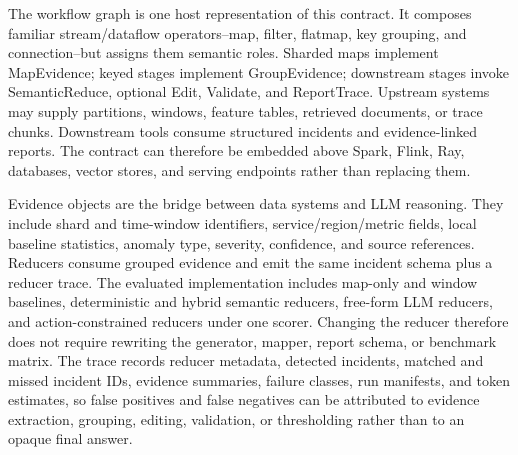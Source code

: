 \documentclass[sigplan,anonymous,nonacm]{acmart}
\begin{document}
The workflow graph is one host representation of this contract. It composes familiar stream/dataflow operators--map, filter, flatmap, key grouping, and connection--but assigns them semantic roles. Sharded maps implement \textsf{MapEvidence}; keyed stages implement \textsf{GroupEvidence}; downstream stages invoke \textsf{SemanticReduce}, optional \textsf{Edit}, \textsf{Validate}, and \textsf{ReportTrace}. Upstream systems may supply partitions, windows, feature tables, retrieved documents, or trace chunks. Downstream tools consume structured incidents and evidence-linked reports. The contract can therefore be embedded above Spark, Flink, Ray, databases, vector stores, and serving endpoints rather than replacing them.

Evidence objects are the bridge between data systems and LLM reasoning. They include shard and time-window identifiers, service/region/metric fields, local baseline statistics, anomaly type, severity, confidence, and source references. Reducers consume grouped evidence and emit the same incident schema plus a reducer trace. The evaluated implementation includes map-only and window baselines, deterministic and hybrid semantic reducers, free-form LLM reducers, and action-constrained reducers under one scorer. Changing the reducer therefore does not require rewriting the generator, mapper, report schema, or benchmark matrix. The trace records reducer metadata, detected incidents, matched and missed incident IDs, evidence summaries, failure classes, run manifests, and token estimates, so false positives and false negatives can be attributed to evidence extraction, grouping, editing, validation, or thresholding rather than to an opaque final answer.
\end{document}
